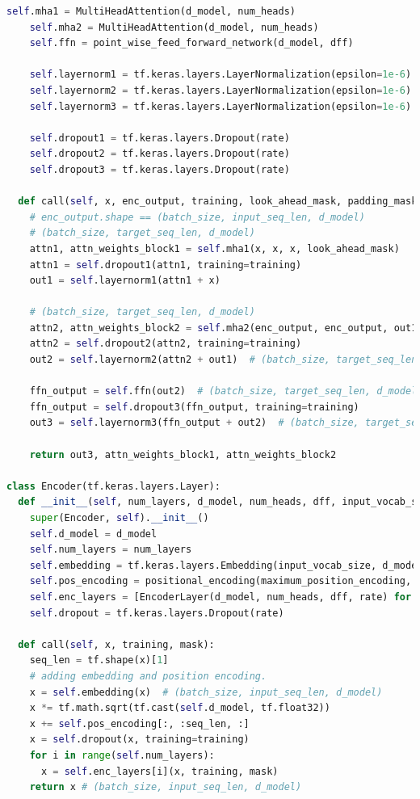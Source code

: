 \begin{lstlisting}[language=Python, style=input]
    self.mha1 = MultiHeadAttention(d_model, num_heads)
    self.mha2 = MultiHeadAttention(d_model, num_heads)
    self.ffn = point_wise_feed_forward_network(d_model, dff)

    self.layernorm1 = tf.keras.layers.LayerNormalization(epsilon=1e-6)
    self.layernorm2 = tf.keras.layers.LayerNormalization(epsilon=1e-6)
    self.layernorm3 = tf.keras.layers.LayerNormalization(epsilon=1e-6)

    self.dropout1 = tf.keras.layers.Dropout(rate)
    self.dropout2 = tf.keras.layers.Dropout(rate)
    self.dropout3 = tf.keras.layers.Dropout(rate)

  def call(self, x, enc_output, training, look_ahead_mask, padding_mask):
    # enc_output.shape == (batch_size, input_seq_len, d_model)
    # (batch_size, target_seq_len, d_model)
    attn1, attn_weights_block1 = self.mha1(x, x, x, look_ahead_mask)
    attn1 = self.dropout1(attn1, training=training)
    out1 = self.layernorm1(attn1 + x)

    # (batch_size, target_seq_len, d_model)
    attn2, attn_weights_block2 = self.mha2(enc_output, enc_output, out1, padding_mask)
    attn2 = self.dropout2(attn2, training=training)
    out2 = self.layernorm2(attn2 + out1)  # (batch_size, target_seq_len, d_model)

    ffn_output = self.ffn(out2)  # (batch_size, target_seq_len, d_model)
    ffn_output = self.dropout3(ffn_output, training=training)
    out3 = self.layernorm3(ffn_output + out2)  # (batch_size, target_seq_len, d_model)

    return out3, attn_weights_block1, attn_weights_block2

class Encoder(tf.keras.layers.Layer):
  def __init__(self, num_layers, d_model, num_heads, dff, input_vocab_size, maximum_position_encoding, rate=0.1):
    super(Encoder, self).__init__()
    self.d_model = d_model
    self.num_layers = num_layers
    self.embedding = tf.keras.layers.Embedding(input_vocab_size, d_model)
    self.pos_encoding = positional_encoding(maximum_position_encoding, self.d_model)
    self.enc_layers = [EncoderLayer(d_model, num_heads, dff, rate) for _ in range(num_layers)]
    self.dropout = tf.keras.layers.Dropout(rate)

  def call(self, x, training, mask):
    seq_len = tf.shape(x)[1]
    # adding embedding and position encoding.
    x = self.embedding(x)  # (batch_size, input_seq_len, d_model)
    x *= tf.math.sqrt(tf.cast(self.d_model, tf.float32))
    x += self.pos_encoding[:, :seq_len, :]
    x = self.dropout(x, training=training)
    for i in range(self.num_layers):
      x = self.enc_layers[i](x, training, mask)
    return x # (batch_size, input_seq_len, d_model)


\end{lstlisting}
